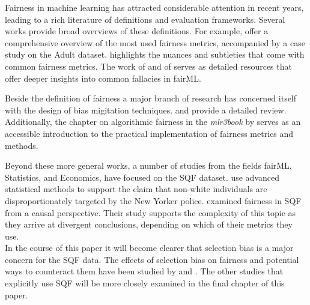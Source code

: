 Fairness in machine learning has attracted considerable attention in recent years, leading to a rich literature of definitions and evaluation frameworks. Several works provide broad overviews of these definitions. For example, \cite{verma2018} offer a comprehensive overview of the most used fairness metrics, accompanied by a case study on the Adult dataset. \cite{castelnovo2022} highlights the nuances and subtleties that come with common fairness metrics. The work of \cite{corbett-davies} and of \cite{barocas-hardt-narayanan} serves as detailed resources that offer deeper insights into common fallacies in fairML.

Beside the definition of fairness a major branch of research has concerned itself with the design of bias migitation techniques. \cite{mehrabi2022} and \cite{caton2024} provide a detailed review. Additionally, the chapter on algorithmic fairness in the \textsl{mlr3book} by \cite{mlr3_book} serves as an accessible introduction to the practical implementation of fairness metrics and methods.\par

Beyond these more general works, a number of studies from the fields fairML, Statistics, and Economics, have focused on the SQF dataset.
\cite{goel2016} use advanced statistical methods to support the claim that non-white individuals are disproportionately targeted by the New Yorker police.
\cite{Khademi2019FADMELC} examined fairness in SQF from a causal perspective. Their study supports the complexity of this topic as they arrive at divergent conclusions, depending on which of their metrics they use.\\
In the course of this paper it will become clearer that selection bias is a major concern for the SQF data. The effects of selection bias on fairness and potential ways to counteract them have been studied by \cite{Lakkaraju2017SLPEAPPU} and \cite{favier2023}.
The other studies that explicitly use SQF \cite{Badr2022DTFANSP, rambachan2016, kallus2018} will be more closely examined in the final chapter of this paper.

